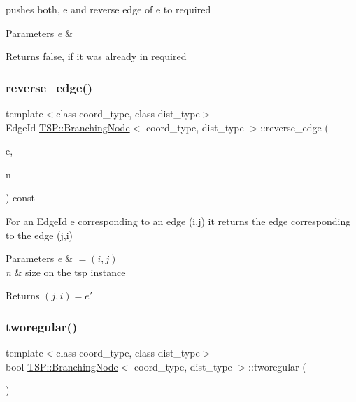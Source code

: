 pushes both, e and reverse edge of e to required 
\begin{DoxyParams}{Parameters}
{\em e} & \\
\hline
\end{DoxyParams}
\begin{DoxyReturn}{Returns}
false, if it was already in required 
\end{DoxyReturn}
\mbox{\label{classTSP_1_1BranchingNode_a5f04fd8afc44fa3965d87e0e28fa01c0}} 
\subsubsection{\texorpdfstring{reverse\+\_\+edge()}{reverse\_edge()}}
{\footnotesize\ttfamily template$<$class coord\+\_\+type, class dist\+\_\+type$>$ \\
Edge\+Id \hyperlink{classTSP_1_1BranchingNode}{T\+S\+P\+::\+Branching\+Node}$<$ coord\+\_\+type, dist\+\_\+type $>$\+::reverse\+\_\+edge (\begin{DoxyParamCaption}\item[{Edge\+Id}]{e,  }\item[{size\+\_\+type}]{n }\end{DoxyParamCaption}) const\hspace{0.3cm}{\ttfamily [inline]}}

For an Edge\+Id e corresponding to an edge (i,j) it returns the edge corresponding to the edge (j,i) 
\begin{DoxyParams}{Parameters}
{\em e} & $ =(i,j)$ \\
\hline
{\em n} & size on the tsp instance \\
\hline
\end{DoxyParams}
\begin{DoxyReturn}{Returns}
$(j,i) = e' $ 
\end{DoxyReturn}
\mbox{\label{classTSP_1_1BranchingNode_a44790ceabe450e8cc5fc718fbd3780da}} 
\subsubsection{\texorpdfstring{tworegular()}{tworegular()}}
{\footnotesize\ttfamily template$<$class coord\+\_\+type, class dist\+\_\+type$>$ \\
bool \hyperlink{classTSP_1_1BranchingNode}{T\+S\+P\+::\+Branching\+Node}$<$ coord\+\_\+type, dist\+\_\+type $>$\+::tworegular (\begin{DoxyParamCaption}{ }\end{DoxyParamCaption})\hspace{0.3cm}{\ttfamily [inline]}}

